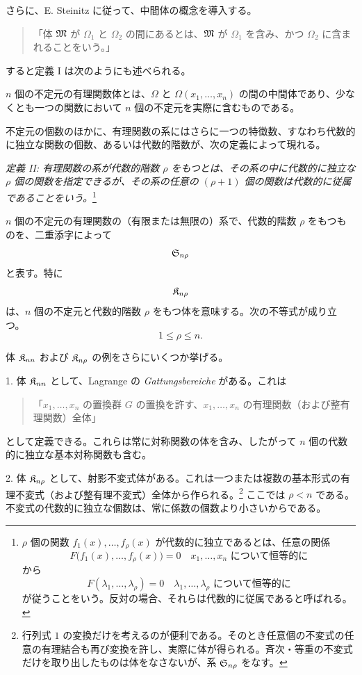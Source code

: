 \documentclass[11pt]{article}
\begin{document}
さらに、E. Steinitz に従って、中間体の概念を導入する。
\begin{quote}
「体 $\mathfrak{M}$ が $\Omega_1$ と $\Omega_2$ の間にあるとは、$\mathfrak{M}$ が $\Omega_1$ を含み、かつ $\Omega_2$ に含まれることをいう。」
\end{quote}
すると定義 I は次のようにも述べられる。

$n$ 個の不定元の有理関数体とは、$\Omega$ と $\Omega(x_1,\ldots,x_n)$ の間の中間体であり、少なくとも一つの関数において $n$ 個の不定元を実際に含むものである。

不定元の個数のほかに、有理関数の系にはさらに一つの特徴数、すなわち代数的に独立な関数の個数、あるいは代数的階数が、次の定義によって現れる。

\emph{定義 II: 有理関数の系が代数的階数 $\rho$ をもつとは、その系の中に代数的に独立な $\rho$ 個の関数を指定できるが、その系の任意の $(\rho+1)$ 個の関数は代数的に従属であることをいう。}\footnote{$\rho$ 個の関数 $f_1(x),\ldots,f_\rho(x)$ が代数的に独立であるとは、任意の関係
\[
F\bigl(f_1(x),\ldots,f_\rho(x)\bigr)=0\quad\text{$x_1,\ldots,x_n$ について恒等的に}
\]
から
\[
F(\lambda_1,\ldots,\lambda_\rho)=0\quad\text{$\lambda_1,\ldots,\lambda_\rho$ について恒等的に}
\]
が従うことをいう。反対の場合、それらは代数的に従属であると呼ばれる。}

$n$ 個の不定元の有理関数の（有限または無限の）系で、代数的階数 $\rho$ をもつものを、二重添字によって
\[
  \mathfrak{S}_{n\rho}
\]
と表す。特に
\[
  \mathfrak{K}_{n\rho}
\]
は、$n$ 個の不定元と代数的階数 $\rho$ をもつ体を意味する。次の不等式が成り立つ。
\[
  1\leq \rho\leq n.
\]

体 $\mathfrak{K}_{nn}$ および $\mathfrak{K}_{n\rho}$ の例をさらにいくつか挙げる。

1. 体 $\mathfrak{K}_{nn}$ として、Lagrange の \emph{Gattungsbereiche} がある。これは
\begin{quote}
「$x_1,\ldots,x_n$ の置換群 $G$ の置換を許す、$x_1,\ldots,x_n$ の有理関数（および整有理関数）全体」
\end{quote}
として定義できる。これらは常に対称関数の体を含み、したがって $n$ 個の代数的に独立な基本対称関数も含む。

2. 体 $\mathfrak{K}_{n\rho}$ として、射影不変式体がある。これは一つまたは複数の基本形式の有理不変式（および整有理不変式）全体から作られる。\footnote{行列式 $1$ の変換だけを考えるのが便利である。そのとき任意個の不変式の任意の有理結合も再び変換を許し、実際に体が得られる。斉次・等重の不変式だけを取り出したものは体をなさないが、系 $\mathfrak{S}_{n\rho}$ をなす。} ここでは $\rho<n$ である。不変式の代数的に独立な個数は、常に係数の個数より小さいからである。
\end{document}
